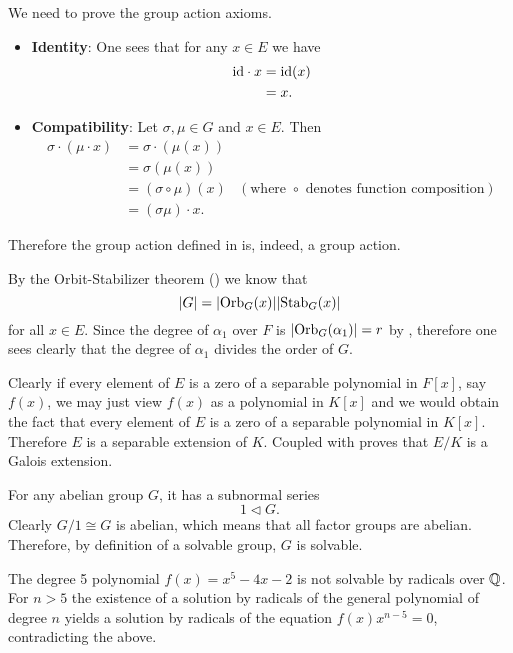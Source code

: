\begin{questions}
    \item We need to prove the group action axioms.
    \begin{itemize}
        \item \textbf{Identity}: One sees that for any $x \in E$ we have
        \begin{align*}
            \mathrm{id}\cdot x &= \mathrm{id}(x)\\
            &= x.
        \end{align*}
        \item \textbf{Compatibility}: Let $\sigma, \mu \in G$ and $x \in E$. Then
        \begin{align*}
            \sigma \cdot (\mu \cdot x) &= \sigma \cdot (\mu(x))\\
            &= \sigma(\mu(x))\\
            &= (\sigma\circ \mu)(x) & (\text{where } \circ \text{ denotes function composition})\\
            &= (\sigma\mu) \cdot x.
        \end{align*}
    \end{itemize}
    Therefore the group action defined in  is, indeed, a group action.

    \item By the Orbit-Stabilizer theorem () we know that
    \[
       |G| = |\mathrm{Orb}_{G}(x)||\mathrm{Stab}_{G}(x)|
    \]
    for all $x \in E$. Since the degree of $\alpha_1$ over $F$ is $|\mathrm{Orb}_{G}(\alpha_1)| = r$ by , therefore one sees clearly that the degree of $\alpha_1$ divides the order of $G$.

    \item Clearly if every element of $E$ is a zero of a separable polynomial in $F[x]$, say $f(x)$, we may just view $f(x)$ as a polynomial in $K[x]$ and we would obtain the fact that every element of $E$ is a zero of a separable polynomial in $K[x]$. Therefore $E$ is a separable extension of $K$. Coupled with  proves that $E/K$ is a Galois extension.

    \item For any abelian group $G$, it has a subnormal series
    \[
        1 \lhd G.
    \]
    Clearly $G/1 \cong G$ is abelian, which means that all factor groups are abelian. Therefore, by definition of a solvable group, $G$ is solvable.

    \item The degree 5 polynomial $f(x) = x^5 - 4x - 2$ is not solvable by radicals over $\mathbb{Q}$. For $n > 5$ the existence of a solution by radicals of the general polynomial of degree $n$ yields a solution by radicals of the equation $f(x)x^{n-5} = 0$, contradicting the above.
\end{questions}

